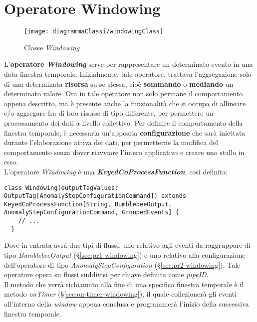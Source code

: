 
\section{Operatore Windowing}\label{sec:windowing}
\begin{figure}[H] 
    \centering 
    \texttt{[image: diagrammaClassi/windowingClass]} 
    \caption{Classe \textit{Windowing}}
\end{figure}
L'\textbf{operatore \textit{Windowing}} serve per rappresentare un determinato evento in una data finestra temporale. Inizialmente, tale operatore, trattava l'aggregazione solo di una determinata \textbf{risorsa} su se stessa, cioè \textbf{sommando} o \textbf{mediando} un determinato valore. Ora in tale operatore non solo permane il comportamento appena descritto, ma è presente anche la funzionalità che si occupa di allineare e/o aggregare fra di loro risorse di tipo differente, per permettere un processamento dei dati a livello collettivo. Per definire il comportamento della finestra temporale, è necessaria un'apposita \textbf{configurazione} che sarà iniettata durante l'elaborazione attiva dei dati, per permetterne la modifica del comportamento senza dover riavviare l'intero applicativo e creare uno stallo in esso.\\
L'operatore \textit{Windowing} è una \textbf{\textit{KeyedCoProcessFunction}}, così definita:
\begin{verbatim}
class Windowing(outputTagValues: OutputTag[AnomalyStepConfigurationCommand]) extends KeyedCoProcessFunction[String, BumblebeeOutput, AnomalyStepConfigurationCommand, GroupedEvents] {
	// ...
  }
\end{verbatim}
Dove in entrata avrà due tipi di flussi, uno relativo agli eventi da raggruppare di tipo \textit{BumblebeeOutput} (\S\ref{sec:pr1-windowing}) e uno relativo alla configurazione dell'operatore di tipo \textit{AnomalyStepConfiguration} (\S\ref{sec:pr2-windowing}). Tale operatore opera su flussi suddivisi per chiave definita come \textit{pipeID}.\\
Il metodo che verrà richiamato alla fine di una specifica finestra temporale è il metodo \textit{onTimer} (\S\ref{sec:on-timer-windowing}), il quale collezionerà gli eventi all'interno della \textit{window} appena conclusa e programmerà l'inizio della successiva finestra temporale.

